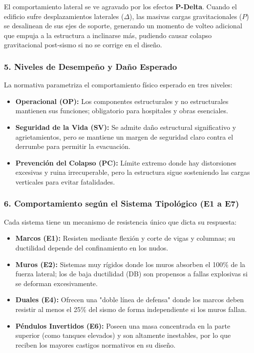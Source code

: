 \documentclass[14pt,letterpaper]{extarticle}
\begin{document}
	El comportamiento lateral se ve agravado por los efectos \textbf{P-Delta}. Cuando el edificio sufre desplazamientos laterales ($\Delta$), las masivas cargas gravitacionales ($P$) se desalinean de sus ejes de soporte, generando un momento de volteo adicional que empuja a la estructura a inclinarse más, pudiendo causar colapso gravitacional post-sismo si no se corrige en el diseño.
	
	\subsubsection{5. Niveles de Desempeño y Daño Esperado}
	
	La normativa parametriza el comportamiento físico esperado en tres niveles:
	
	\begin{itemize}
		\item \textbf{Operacional (OP):} Los componentes estructurales y no estructurales mantienen sus funciones; obligatorio para hospitales y obras esenciales.
		
		\item \textbf{Seguridad de la Vida (SV):} Se admite daño estructural significativo y agrietamientos, pero se mantiene un margen de seguridad claro contra el derrumbe para permitir la evacuación.
		
		\item \textbf{Prevención del Colapso (PC):} Límite extremo donde hay distorsiones excesivas y ruina irrecuperable, pero la estructura sigue sosteniendo las cargas verticales para evitar fatalidades.
	\end{itemize}
	
	\subsubsection{6. Comportamiento según el Sistema Tipológico (E1 a E7)}
	
	Cada sistema tiene un mecanismo de resistencia único que dicta su respuesta:
	
	\begin{itemize}
		\item \textbf{Marcos (E1):} Resisten mediante flexión y corte de vigas y columnas; su ductilidad depende del confinamiento en los nudos.
		
		\item \textbf{Muros (E2):} Sistemas muy rígidos donde los muros absorben el 100\% de la fuerza lateral; los de baja ductilidad (DB) son propensos a fallas explosivas si se deforman excesivamente.
		
		\item \textbf{Duales (E4):} Ofrecen una "doble línea de defensa" donde los marcos deben resistir al menos el 25\% del sismo de forma independiente si los muros fallan.
		
		\item \textbf{Péndulos Invertidos (E6):} Poseen una masa concentrada en la parte superior (como tanques elevados) y son altamente inestables, por lo que reciben los mayores castigos normativos en su diseño.
	\end{itemize}
	
\end{document}
